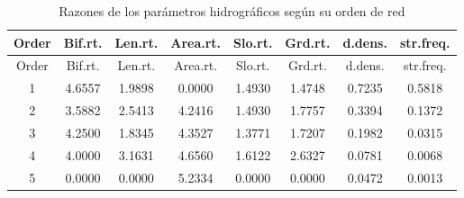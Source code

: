 \documentclass[11pt,]{article}
\begin{document}
\begin{longtable}[]{@{}cccccccc@{}}
\caption{\label{tab:razones} Razones de los parámetros hidrográficos
según su orden de red}\tabularnewline
\toprule
Order & Bif.rt. & Len.rt. & Area.rt. & Slo.rt. & Grd.rt. & d.dens. &
str.freq.\tabularnewline
\midrule
\endfirsthead
\toprule
Order & Bif.rt. & Len.rt. & Area.rt. & Slo.rt. & Grd.rt. & d.dens. &
str.freq.\tabularnewline
\midrule
\endhead
1 & 4.6557 & 1.9898 & 0.0000 & 1.4930 & 1.4748 & 0.7235 &
0.5818\tabularnewline
2 & 3.5882 & 2.5413 & 4.2416 & 1.4930 & 1.7757 & 0.3394 &
0.1372\tabularnewline
3 & 4.2500 & 1.8345 & 4.3527 & 1.3771 & 1.7207 & 0.1982 &
0.0315\tabularnewline
4 & 4.0000 & 3.1631 & 4.6560 & 1.6122 & 2.6327 & 0.0781 &
0.0068\tabularnewline
5 & 0.0000 & 0.0000 & 5.2334 & 0.0000 & 0.0000 & 0.0472 &
0.0013\tabularnewline
\bottomrule
\end{longtable}
\end{document}
